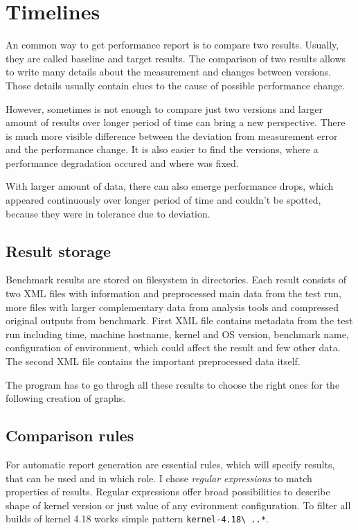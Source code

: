 \chapter{Timelines}
An common way to get performance report is to compare two results. Usually, they
are called baseline and target results. The comparison of two results allows to
write many details about the measurement and changes between versions. Those
details usually contain clues to the cause of possible performance change.

However, sometimes is not enough to compare just two versions and larger amount
of results over longer period of time can bring a new perspective. There is much
more visible difference between the deviation from measurement error and the
performance change. It is also easier to find the versions, where a
performance degradation occured and where was fixed.

With larger amount of data, there can also emerge performance drops, which
appeared continuously over longer period of time and couldn't be spotted,
because they were in tolerance due to deviation.

\section{Result storage}
Benchmark results are stored on filesystem in directories. Each result consists
of two XML files with information and preprocessed main data from the test run,
more files with larger complementary data from analysis tools and compressed
original outputs from benchmark. First XML file contains metadata from the test
run including time, machine hostname, kernel and OS version, benchmark name,
configuration of environment, which could affect the result and few other data.
The second XML file contains the important preprocessed data itself.

The program has to go throgh all these results to choose the right ones for the
following creation of graphs.

\section{Comparison rules}
For automatic report generation are essential rules, which will specify results,
that can be used and in which role. I chose \emph{regular expressions} to match
properties of results. Regular expressions offer broad possibilities to describe
shape of kernel version or just value of any evironment configuration. To filter
all builds of kernel 4.18 works simple pattern \texttt{kernel-4.18\textbackslash
..*}.

